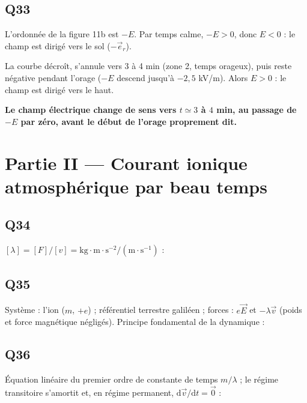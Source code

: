 \documentclass[11pt,a4paper]{article}
\newcommand{\equationajustee}[1]{%
  \sbox{\boiteequation}{$\displaystyle #1$}%
  \ifdim\wd\boiteequation>\linewidth
    \[\resizebox{\linewidth}{!}{\usebox{\boiteequation}}\]%
  \else
    \[#1\]%
  \fi}
\begin{document}
\hypertarget{q33}{%
\subsection{Q33}\label{q33}}

L'ordonnée de la figure 11b est \(-E\). Par temps calme, \(-E>0\), donc \(E<0\) : le champ est dirigé vers le sol (\(-\vec e_r\)).

La courbe décroît, s'annule vers 3 à 4 min (zone 2, temps orageux), puis reste négative pendant l'orage (\(-E\) descend jusqu'à \(-2{,}5\) kV/m). Alors \(E>0\) : le champ est dirigé vers le haut.

\textbf{Le champ électrique change de sens vers \(t\simeq3\) à \(4\) min, au passage de \(-E\) par zéro, avant le début de l'orage proprement dit.}

\hypertarget{partie-ii-courant-ionique-atmosphuxe9rique-par-beau-temps}{%
\section{Partie II --- Courant ionique atmosphérique par beau temps}\label{partie-ii-courant-ionique-atmosphuxe9rique-par-beau-temps}}

\hypertarget{q34}{%
\subsection{Q34}\label{q34}}

\([\lambda]=[F]/[v]=\mathrm{kg\cdot m\cdot s^{-2}}/(\mathrm{m\cdot s^{-1}})\) :
\equationajustee{\boxed{\lambda\ \text{en}\ \mathrm{kg\cdot s^{-1}}}}

\hypertarget{q35}{%
\subsection{Q35}\label{q35}}

Système : l'ion (\(m\), \(+e\)) ; référentiel terrestre galiléen ; forces : \(e\vec E\) et \(-\lambda\vec v\) (poids et force magnétique négligés). Principe fondamental de la dynamique :
\equationajustee{\boxed{m\frac{\mathrm d\vec v}{\mathrm dt}+\lambda\vec v=e\vec E}}

\hypertarget{q36}{%
\subsection{Q36}\label{q36}}

Équation linéaire du premier ordre de constante de temps \(m/\lambda\) ; le régime transitoire s'amortit et, en régime permanent, \(\mathrm d\vec v/\mathrm dt=\vec0\) :
\equationajustee{\boxed{\vec v_\ell=\frac e\lambda\,\vec E}}
\end{document}
